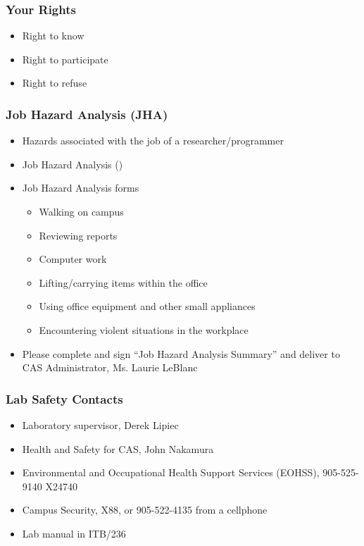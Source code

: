 \documentclass[handout]{beamer} %
\begin{document}

\begin{frame}
\frametitle{Your Rights}

\begin{itemize}
\item Right to know
\item Right to participate
\item Right to refuse
\end{itemize}

\end{frame}


\begin{frame}
\frametitle{Job Hazard Analysis (JHA)}

\begin{itemize}

\item Hazards associated with the job of a researcher/programmer
\item Job Hazard Analysis ()
\item Job Hazard Analysis forms
\begin{itemize}
\item Walking on campus
\item Reviewing reports
\item Computer work
\item Lifting/carrying items within the office
\item Using office equipment and other small appliances
\item Encountering violent situations in the workplace
\end{itemize}
\item Please complete and sign ``Job Hazard Analysis Summary'' and deliver to
  CAS Administrator, Ms. Laurie LeBlanc
\end{itemize}

\end{frame}


\begin{frame}
\frametitle{Lab Safety Contacts}

\begin{itemize}
\item Laboratory supervisor, Derek Lipiec
\item Health and Safety for CAS, John Nakamura
\item Environmental and Occupational Health Support Services (EOHSS), 905-525-9140 X24740
\item Campus Security, X88, or 905-522-4135 from a cellphone
\item Lab manual in ITB/236
\end{itemize}

\end{frame}
\end{document}
